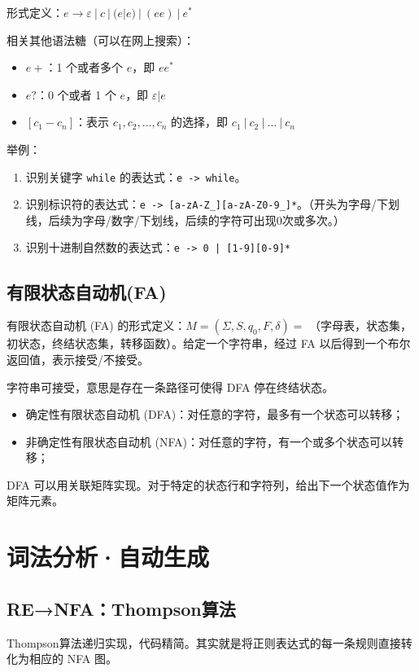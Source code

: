 \documentclass[UTF8]{ctexart}
\newcommand\OR{\ |\ }
\newcommand\Emph[1]{\textcolor{cyan!80!black}{#1}}
\begin{document}
形式定义：$e \to \varepsilon \OR c \OR (e|e) \OR (ee) \OR e^*$

相关其他语法糖（可以在网上搜索）：
\begin{itemize}[itemsep=0pt,parsep=0pt,leftmargin=1.5cm]
  \item $e+$：1 个或者多个 $e$，即 $ee^*$
  \item $e?$：0 个或者 1 个 $e$，即 $\varepsilon|e$
  \item $[c_1-c_n]$：表示 $c_1,c_2,\dots,c_n$ 的选择，即 $c_1\OR c_2\OR\dots\OR c_n$
\end{itemize}

举例：
\begin{enumerate}
  \item 识别关键字 \verb!while! 的表达式：\verb!e -> while!。
  \item 识别标识符的表达式：\verb!e -> [a-zA-Z_][a-zA-Z0-9_]*!。（开头为字母/下划线，后续为字母/数字/下划线，后续的字符可出现0次或多次。）
  \item 识别十进制自然数的表达式：\verb!e -> 0 | [1-9][0-9]*!
\end{enumerate}

\subsection{有限状态自动机(FA)}
\Emph{有限状态自动机 (FA)} 的形式定义：$M = (\varSigma, S, q_0, F, \delta) =$ （字母表，状态集，初状态，终结状态集，转移函数）。给定一个字符串，经过 FA 以后得到一个布尔返回值，表示接受/不接受。

字符串可接受，意思是\Emph{存在}一条路径可使得 DFA 停在终结状态。

\begin{itemize}
  \item 确定性有限状态自动机 (\Emph{DFA})：对任意的字符，最多有一个状态可以转移；
  \item 非确定性有限状态自动机 (\Emph{NFA})：对任意的字符，有一个或多个状态可以转移；
\end{itemize}

DFA 可以用关联矩阵实现。对于特定的状态行和字符列，给出下一个状态值作为矩阵元素。

\section{词法分析·自动生成}
\subsection{RE→NFA：Thompson算法}
\Emph{Thompson算法}递归实现，代码精简。其实就是将正则表达式的每一条规则直接转化为相应的 NFA 图。
\end{document}
